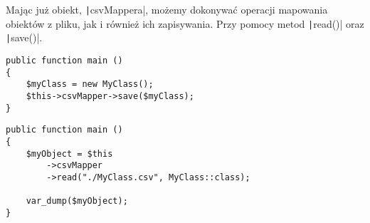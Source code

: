 Mając już obiekt, \texttt|csvMappera|, możemy dokonywać operacji mapowania obiektów z pliku, jak i również ich zapisywania. Przy pomocy metod \texttt|read()| oraz \texttt|save()|.

\begin{empty}
	\begin{verbatim}
public function main ()
{
	$myClass = new MyClass();
	$this->csvMapper->save($myClass);
}
	\end{verbatim}
	\vspace{-10pt}
\end{empty}


\begin{empty}
	\begin{verbatim}
public function main ()
{
	$myObject = $this
		->csvMapper
		->read("./MyClass.csv", MyClass::class);
	
	var_dump($myObject);
}
	\end{verbatim}
	\vspace{-10pt}
\end{empty}